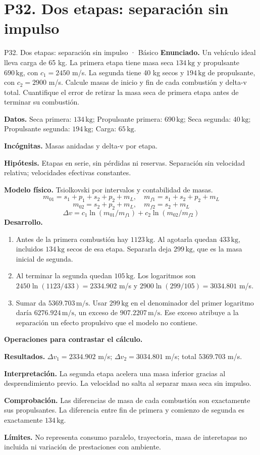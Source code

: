 \section{P32. Dos etapas: separación sin impulso}
\begin{studiumworked}{P32. Dos etapas: separación sin impulso · Básico}
\textbf{Enunciado.} Un vehículo ideal lleva carga de 65 kg. La primera etapa tiene masa seca $134\,\mathrm{kg}$ y propulsante $690\,\mathrm{kg}$, con $c_1=2450$ m/s. La segunda tiene 40 kg secos y $194\,\mathrm{kg}$ de propulsante, con $c_2=2900$ m/s. Calcule masas de inicio y fin de cada combustión y delta-v total. Cuantifique el error de retirar la masa seca de primera etapa antes de terminar su combustión.

\textbf{Datos.} Seca primera: $134\,\mathrm{kg}$; Propulsante primera: $690\,\mathrm{kg}$; Seca segunda: $40\,\mathrm{kg}$; Propulsante segunda: $194\,\mathrm{kg}$; Carga: $65\,\mathrm{kg}$.

\textbf{Incógnitas.} Masas anidadas y delta-v por etapa.

\textbf{Hipótesis.} Etapas en serie, sin pérdidas ni reservas. Separación sin velocidad relativa; velocidades efectivas constantes.

\textbf{Modelo físico.} Tsiolkovski por intervalos y contabilidad de masas.
\[m_{01}=s_1+p_1+s_2+p_2+m_L,\quad m_{f1}=s_1+s_2+p_2+m_L\]
\[m_{02}=s_2+p_2+m_L,\quad m_{f2}=s_2+m_L\]
\[\Delta v=c_1\ln(m_{01}/m_{f1})+c_2\ln(m_{02}/m_{f2})\]
\textbf{Desarrollo.}
\begin{enumerate}
\item Antes de la primera combustión hay $1123\,\mathrm{kg}$. Al agotarla quedan $433\,\mathrm{kg}$, incluidos $134\,\mathrm{kg}$ secos de esa etapa. Separarla deja $299\,\mathrm{kg}$, que es la masa inicial de segunda.
\item Al terminar la segunda quedan $105\,\mathrm{kg}$. Los logaritmos son $2450\ln(1123/433)=2334.902$ m/s y $2900\ln(299/105)=3034.801$ m/s.
\item Sumar da $5369.703\,\mathrm{m/s}$. Usar $299\,\mathrm{kg}$ en el denominador del primer logaritmo daría $6276.924\,\mathrm{m/s}$, un exceso de $907.2207\,\mathrm{m/s}$. Ese exceso atribuye a la separación un efecto propulsivo que el modelo no contiene.
\end{enumerate}
\textbf{Operaciones para contrastar el cálculo.}

\textbf{Resultados.} $\Delta v_1=2334.902$ m/s; $\Delta v_2=3034.801$ m/s; total $5369.703$ m/s.

\textbf{Interpretación.} La segunda etapa acelera una masa inferior gracias al desprendimiento previo. La velocidad no salta al separar masa seca sin impulso.

\textbf{Comprobación.} Las diferencias de masa de cada combustión son exactamente sus propulsantes. La diferencia entre fin de primera y comienzo de segunda es exactamente $134\,\mathrm{kg}$.

\textbf{Límites.} No representa consumo paralelo, trayectoria, masa de interetapas no incluida ni variación de prestaciones con ambiente.
\end{studiumworked}
